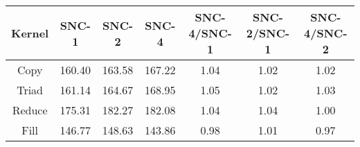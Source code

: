 \begin{tabular}{|c|c|c|c|c|c|c|}  \hline
Kernel&SNC-1&SNC-2&SNC-4 & SNC-4/SNC-1 & SNC-2/SNC-1 & SNC-4/SNC-2 \\ \hline 
Copy & 160.40 & 163.58 & 167.22  & 1.04 & 1.02 & 1.02 \\ \hline 
Triad & 161.14 & 164.67 & 168.95  & 1.05 & 1.02 & 1.03 \\ \hline 
Reduce & 175.31 & 182.27 & 182.08  & 1.04 & 1.04 & 1.00 \\ \hline 
Fill & 146.77 & 148.63 & 143.86  & 0.98 & 1.01 & 0.97 \\ \hline 
\end{tabular}
